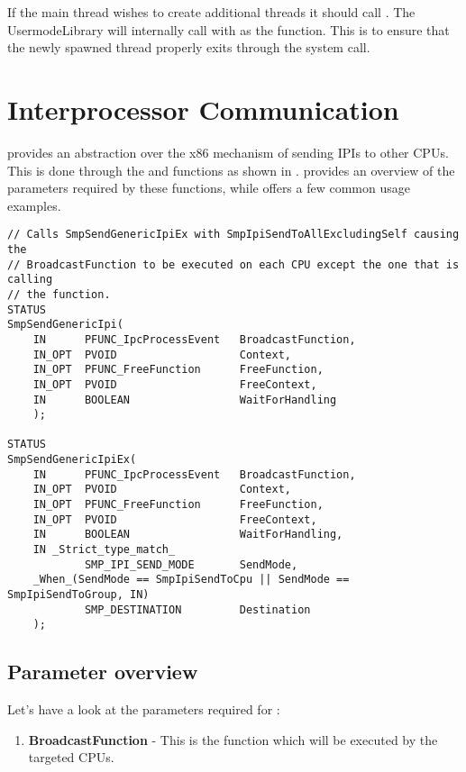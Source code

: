 \begin{appendices}
If the main thread wishes to create additional threads it should call . The
UsermodeLibrary will internally call  with  as the
function. This is to ensure that the newly spawned thread properly exits through the
 system call.

\section{Interprocessor Communication}
\label{sect:IntCpuComm}

\projectname provides an abstraction over the x86 mechanism of sending IPIs to other CPUs. This is done through the  and  functions as shown in .  provides an overview of the parameters required by these functions, while  offers a few common usage examples.

\begin{lstlisting}[caption={IPI functions},label={lst:SmpIpi}]
// Calls SmpSendGenericIpiEx with SmpIpiSendToAllExcludingSelf causing the
// BroadcastFunction to be executed on each CPU except the one that is calling
// the function.
STATUS
SmpSendGenericIpi(
    IN      PFUNC_IpcProcessEvent   BroadcastFunction,
    IN_OPT  PVOID                   Context,
    IN_OPT  PFUNC_FreeFunction      FreeFunction,
    IN_OPT  PVOID                   FreeContext,
    IN      BOOLEAN                 WaitForHandling
    );

STATUS
SmpSendGenericIpiEx(
    IN      PFUNC_IpcProcessEvent   BroadcastFunction,
    IN_OPT  PVOID                   Context,
    IN_OPT  PFUNC_FreeFunction      FreeFunction,
    IN_OPT  PVOID                   FreeContext,
    IN      BOOLEAN                 WaitForHandling,
    IN _Strict_type_match_
            SMP_IPI_SEND_MODE       SendMode,
    _When_(SendMode == SmpIpiSendToCpu || SendMode == SmpIpiSendToGroup, IN)
            SMP_DESTINATION         Destination
    );
\end{lstlisting}
\subsection{Parameter overview}
\label{sect:SmpIpiParam}

Let's have a look at the parameters required for :
\begin{enumerate}
	\item \textbf{BroadcastFunction} - This is the function which will be executed by the targeted CPUs.


\end{enumerate}
\end{appendices}
